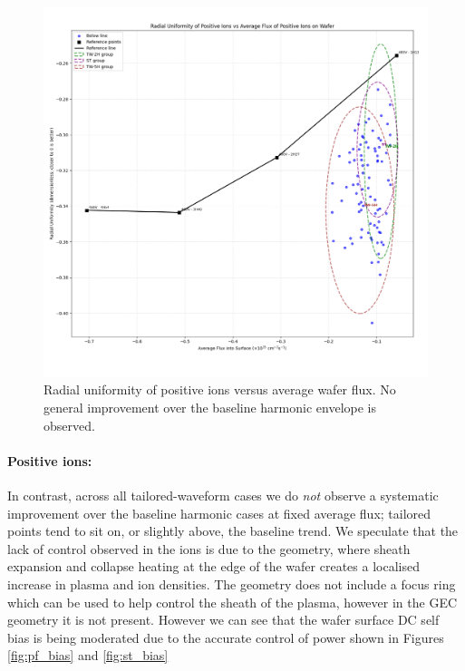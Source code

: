 \documentclass[12pt]{article}
\begin{document}
\begin{figure}[H]
  \centering
  \includegraphics[width=\linewidth]{Figures/Uniformity vs Avg Flux - 0-5.2cm - Positive Ions.png}
  \caption{Radial uniformity of positive ions versus average wafer flux. No general improvement over the baseline harmonic envelope is observed.}
  \label{fig:ion_u}
\end{figure}

\paragraph{Positive ions:}
In contrast, across all tailored-waveform cases we do \emph{not} observe a systematic improvement over the baseline harmonic cases at fixed average flux; tailored points tend to sit on, or slightly above, the baseline trend. We speculate that the lack of control observed in the ions is due to the geometry, where sheath expansion and collapse heating at the edge of the wafer creates a localised increase in plasma and ion densities. The geometry does not include a focus ring which can be used to help control the sheath of the plasma, however in the GEC geometry it is not present. However we can see that the wafer surface DC self bias is being moderated due to the accurate control of power shown in Figures \ref{fig:pf_bias} and \ref{fig:st_bias}
\end{document}
